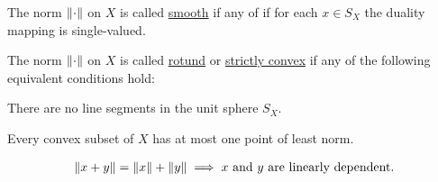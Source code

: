 \begin{definition}\label{def:smooth_norm}\cite[Definition 2.36]{Phelps1993}
  The norm $\left\Vert \cdot \right\Vert$ on $X$ is called \uline{smooth} if any of  if for each $x \in S_X$ the duality mapping is single-valued.
\end{definition}

\begin{definition}\label{def:rotund_norm}\cite[Definition 2.36]{Phelps1993}
  The norm $\left\Vert \cdot \right\Vert$ on $X$ is called \uline{rotund} or \uline{strictly convex} if any of the following equivalent conditions hold:
  \begin{defenum}
    \item\label{def:rotund_norm/no_sphere_segments} There are no line segments in the unit sphere $S_X$.
    \item\label{def:rotund_norm/least_norm} Every convex subset of $X$ has at most one point of least norm.
    \item\label{def:rotund_norm/linearly_dependent}
    \begin{align}\label{def:rotund_norm/linearly_dependent/equation}
      \left\Vert x + y \right\Vert = \left\Vert x \right\Vert + \left\Vert y \right\Vert \implies x \text{ and } y \text{ are linearly dependent}.
    \end{align}
  \end{defenum}
\end{definition}
